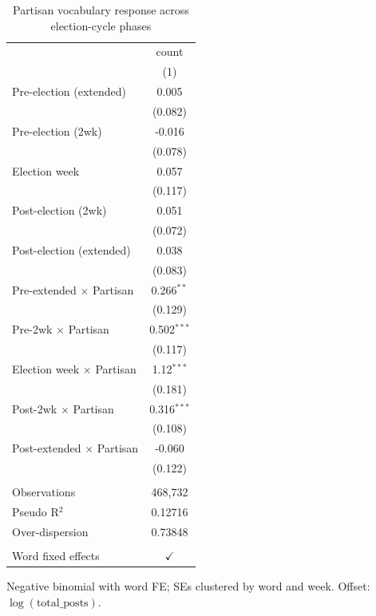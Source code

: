 
\begin{table}[htbp]
   \caption{\label{tab:nb-phase-partisan} Partisan vocabulary response across election-cycle phases}
   \bigskip
   \centering
   \begin{tabular}{lc}
      \toprule
                                       & count\\  
                                       & (1)\\  
      \midrule 
      Pre-election (extended)          & 0.005\\   
                                       & (0.082)\\   
      Pre-election (2wk)               & -0.016\\   
                                       & (0.078)\\   
      Election week                    & 0.057\\   
                                       & (0.117)\\   
      Post-election (2wk)              & 0.051\\   
                                       & (0.072)\\   
      Post-election (extended)         & 0.038\\   
                                       & (0.083)\\   
      Pre-extended $\times$ Partisan   & 0.266$^{**}$\\   
                                       & (0.129)\\   
      Pre-2wk $\times$ Partisan        & 0.502$^{***}$\\   
                                       & (0.117)\\   
      Election week $\times$ Partisan  & 1.12$^{***}$\\   
                                       & (0.181)\\   
      Post-2wk $\times$ Partisan       & 0.316$^{***}$\\   
                                       & (0.108)\\   
      Post-extended $\times$ Partisan  & -0.060\\   
                                       & (0.122)\\   
       \\
      Observations                     & 468,732\\  
      Pseudo R$^2$                     & 0.12716\\  
      Over-dispersion                  & 0.73848\\  
       \\
      Word fixed effects               & $\checkmark$\\   
      \bottomrule
   \end{tabular}
   
   \par \raggedright 
   Negative binomial with word FE; SEs clustered by word and week. Offset: $\log(\text{total\_posts})$.
\end{table}


